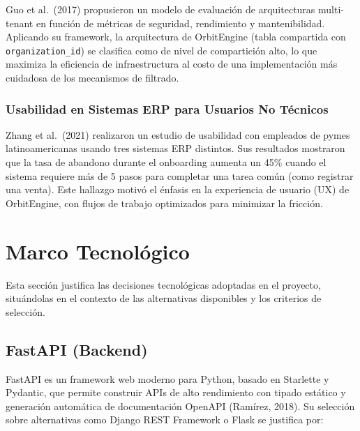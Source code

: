 Guo et al.~(2017) propusieron un modelo de evaluación de arquitecturas multi-tenant en función de métricas de seguridad, rendimiento y mantenibilidad. Aplicando su framework, la arquitectura de OrbitEngine (tabla compartida con \texttt{organization\_id}) se clasifica como de nivel de compartición alto, lo que maximiza la eficiencia de infraestructura al costo de una implementación más cuidadosa de los mecanismos de filtrado.

\subsubsection{Usabilidad en Sistemas ERP para Usuarios No Técnicos}\label{usabilidad-en-sistemas-erp-para-usuarios-no-tuxe9cnicos}

Zhang et al.~(2021) realizaron un estudio de usabilidad con empleados de pymes latinoamericanas usando tres sistemas ERP distintos. Sus resultados mostraron que la tasa de abandono durante el onboarding aumenta un 45\% cuando el sistema requiere más de 5 pasos para completar una tarea común (como registrar una venta). Este hallazgo motivó el énfasis en la experiencia de usuario (UX) de OrbitEngine, con flujos de trabajo optimizados para minimizar la fricción.

\section{Marco Tecnológico}\label{marco-tecnoluxf3gico}

Esta sección justifica las decisiones tecnológicas adoptadas en el proyecto, situándolas en el contexto de las alternativas disponibles y los criterios de selección.

\subsection{FastAPI (Backend)}\label{fastapi-backend}

FastAPI es un framework web moderno para Python, basado en Starlette y Pydantic, que permite construir APIs de alto rendimiento con tipado estático y generación automática de documentación OpenAPI (Ramírez, 2018). Su selección sobre alternativas como Django REST Framework o Flask se justifica por:

